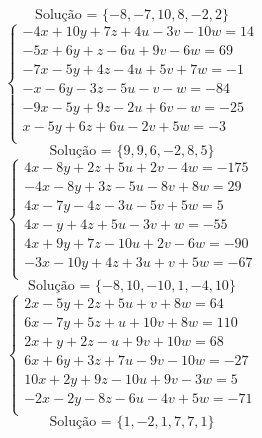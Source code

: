 \documentclass[12pt,oneside,a4paper]{article}
\begin{document}
\begin{equation*}
\text{Solução = }\{-8,-7,10,8,-2,2\}
\end{equation*}
\vspace{\baselineskip}
\begin{equation*}
\begin{cases}
-4x+10y+7z+4u-3v-10w=14 \\
-5x+6y+z-6u+9v-6w=69 \\
-7x-5y+4z-4u+5v+7w=-1 \\
-x-6y-3z-5u-v-w=-84 \\
-9x-5y+9z-2u+6v-w=-25 \\
x-5y+6z+6u-2v+5w=-3 \\
\end{cases}
\end{equation*}
\begin{equation*}
\text{Solução = }\{9,9,6,-2,8,5\}
\end{equation*}
\vspace{\baselineskip}
\begin{equation*}
\begin{cases}
4x-8y+2z+5u+2v-4w=-175 \\
-4x-8y+3z-5u-8v+8w=29 \\
4x-7y-4z-3u-5v+5w=5 \\
4x-y+4z+5u-3v+w=-55 \\
4x+9y+7z-10u+2v-6w=-90 \\
-3x-10y+4z+3u+v+5w=-67 \\
\end{cases}
\end{equation*}
\begin{equation*}
\text{Solução = }\{-8,10,-10,1,-4,10\}
\end{equation*}
\vspace{\baselineskip}
\begin{equation*}
\begin{cases}
2x-5y+2z+5u+v+8w=64 \\
6x-7y+5z+u+10v+8w=110 \\
2x+y+2z-u+9v+10w=68 \\
6x+6y+3z+7u-9v-10w=-27 \\
10x+2y+9z-10u+9v-3w=5 \\
-2x-2y-8z-6u-4v+5w=-71 \\
\end{cases}
\end{equation*}
\begin{equation*}
\text{Solução = }\{1,-2,1,7,7,1\}
\end{equation*}
\end{document}
